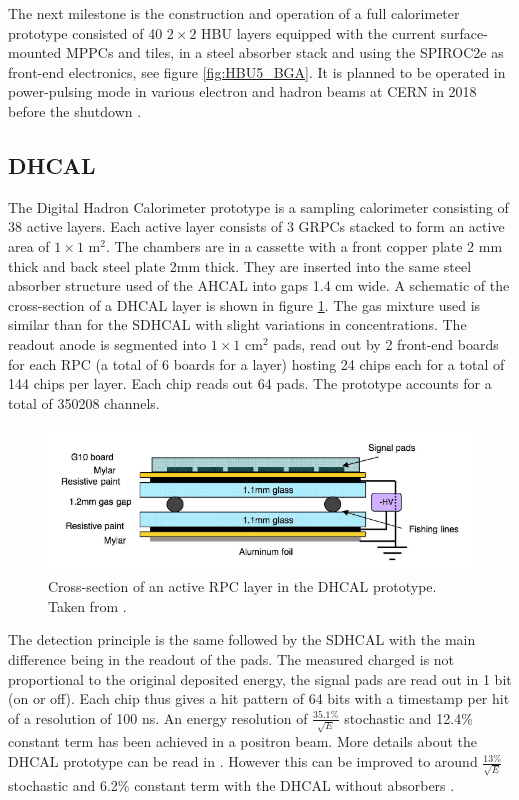 The next milestone is the construction and operation of a full calorimeter prototype consisted of 40 $2\times2$ HBU layers equipped with the current surface-mounted MPPCs and tiles, in a steel absorber stack and using the SPIROC2e as front-end electronics, see figure \ref{fig:HBU5_BGA}. It is planned to be operated in power-pulsing mode in various electron and hadron beams at CERN in 2018 before the shutdown \cite{Felix:AHCALMain2017}.

\subsection{DHCAL}

The Digital Hadron Calorimeter prototype \cite{Bilki:2013bea} is a sampling calorimeter consisting of 38 active layers. Each active layer consists of 3 GRPCs stacked to form an active area of $1\times1$ m$^2$. The chambers are in a cassette with a front copper plate 2 mm thick and back steel plate 2mm thick. They are inserted into the same steel absorber structure used of the AHCAL into gaps 1.4 cm wide. A schematic of the cross-section of a DHCAL layer is shown in figure \ref{fig:DHCALCross}. The gas mixture used is similar than for the SDHCAL with slight variations in concentrations. The readout anode is segmented into $1\times1$ cm$^2$ pads, read out by 2 front-end boards for each RPC (a total of 6 boards for a layer) hosting 24 chips each for a total of 144 chips per layer. Each chip reads out 64 pads. The prototype accounts for a total of 350208 channels.

\begin{figure}[htbp!]
  \centering
  \includegraphics[width=0.9\linewidth]{chap3/fig/Cross-section-DHCAL.png}
  \caption{Cross-section of an active RPC layer in the DHCAL prototype. Taken from \cite{1748-0221-3-05-P05001}.} \label{fig:DHCALCross}
\end{figure}

The detection principle is the same followed by the SDHCAL with the main difference being in the readout of the pads. The measured charged is not proportional to the original deposited energy, the signal pads are read out in 1 bit (on or off). Each chip thus gives a hit pattern of 64 bits with a timestamp per hit of a resolution of 100 ns. An energy resolution of $\frac{35.1\%}{\sqrt{E}}$ stochastic and 12.4\% constant term has been achieved in a positron beam. More details about the DHCAL prototype can be read in \cite{Neubueser2016}. However this can be improved to around $\frac{13\%}{\sqrt{E}}$ stochastic and 6.2\% constant term with the DHCAL without absorbers \cite{Freund:2016wvz}.

